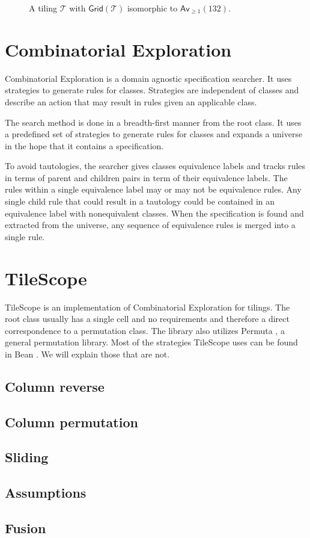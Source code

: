 \begin{figure}[ht!]
    \centering
    
    \caption{A tiling $\mathcal{T}$ with $\textsf{Grid}(\mathcal{T})$ isomorphic to $\textsf{Av}_{\geq1}(132)$.}
    \label{fig:tiling132}
\end{figure}

\section{Combinatorial Exploration}
Combinatorial Exploration \cite{css} is a domain agnostic specification searcher. It uses strategies to generate rules for classes. Strategies are independent of classes and describe an action that may result in rules given an applicable class. 

The search method is done in a breadth-first manner from the root class. It uses a predefined set of strategies to generate rules for classes and expands a universe in the hope that it contains a specification.

To avoid tautologies, the searcher gives classes equivalence labels and tracks rules in terms of parent and children pairs in term of their equivalence labels. The rules within a single equivalence label may or may not be equivalence rules. Any single child rule that could result in a tautology could be contained in an equivalence label with nonequivalent classes. When the specification is found and extracted from the universe, any sequence of equivalence rules is merged into a single rule.


\section{TileScope}
TileScope \cite{tiling} is an implementation of Combinatorial Exploration for tilings. The root class usually has a single cell and no requirements and therefore a direct correspondence to a permutation class. The library also utilizes Permuta \cite{permuta}, a general permutation library. Most of the strategies TileScope uses can be found in Bean \cite{BeanPhd:phd}. We will explain those that are not.

\subsection{Column reverse}

\subsection{Column permutation}

\subsection{Sliding}

\subsection{Assumptions}

\subsection{Fusion}
